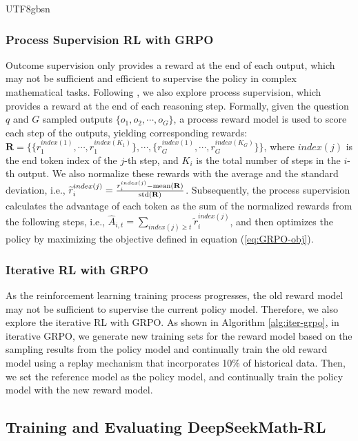 \documentclass[11pt, a4paper, logo, copyright, nonumbering]{deepseek}
\newcommand{\spmath}{DeepSeekMath}
\begin{document}
\begin{CJK*}{UTF8}{gbsn}
\subsubsection{Process Supervision RL with GRPO} 
Outcome supervision only provides a reward at the end of each output, which may not be sufficient and efficient to supervise the policy in complex mathematical tasks. Following \cite{wang2023math}, we also explore process supervision, which provides a reward at the end of each reasoning step. Formally, given the question $q$ and $G$  sampled outputs $\{o_1, o_2, \cdots, o_G\}$, a process reward model is used to score each step of the outputs, yielding corresponding rewards: $\mathbf{R} = \{ \{r_1^{index(1)},\cdots,r_1^{index(K_1)}\}, \cdots,  \{r_G^{index(1)},\cdots,r_G^{index(K_G)}\} \}$, where $index(j)$ is the end token index of the $j$-th step, and $K_i$ is the total number of steps in the $i$-th output. We also normalize these rewards with the average and the standard deviation, i.e., $\widetilde{r}_i^{index(j)} = \frac{r_i^{index(j)} - {\rm mean(\mathbf{R})}}{{\rm std(\mathbf{R})}}$.
Subsequently, the process supervision calculates the advantage of each token as the sum of the normalized rewards from the following steps, i.e., $\hat{A}_{i, t} = \sum_{index(j) \ge t} \widetilde{r}_i^{index(j)}$,
and then optimizes the policy by maximizing the objective defined in equation (\ref{eq:GRPO-obj}).






\subsubsection{Iterative RL with GRPO}
As the reinforcement learning training process progresses, the old reward model may not be sufficient to supervise the current policy model.
Therefore, we also explore the iterative RL with GRPO.
As shown in Algorithm \ref{alg:iter-grpo}, in iterative GRPO, we generate new training sets for the reward model based on the sampling results from the policy model and continually train the old reward model using a replay mechanism that incorporates 10\% of historical data.
Then, we set the reference model as the policy model, and continually train the policy model with the new reward model.

\subsection{Training and Evaluating \spmath-RL}


\end{CJK*}
\end{document}
